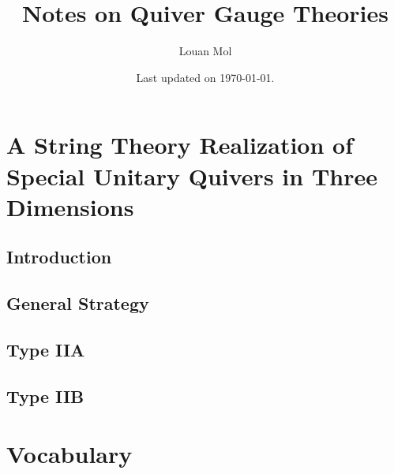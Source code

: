 \documentclass[a4paper,8pt]{article}
\title{Notes on Quiver Gauge Theories}
\author{Louan Mol}
\date{Last updated on \today.}
\begin{document}
\maketitle

\vspace{2cm}

\tableofcontents
  
\pagebreak

\nocite{*}

\section{A String Theory Realization of Special Unitary Quivers in Three Dimensions}

    \subsection{Introduction}

    \subsection{General Strategy}

    \subsection{Type IIA}

    \subsection{Type IIB}

\pagebreak
\appendix

\section{Vocabulary}
\end{document}
